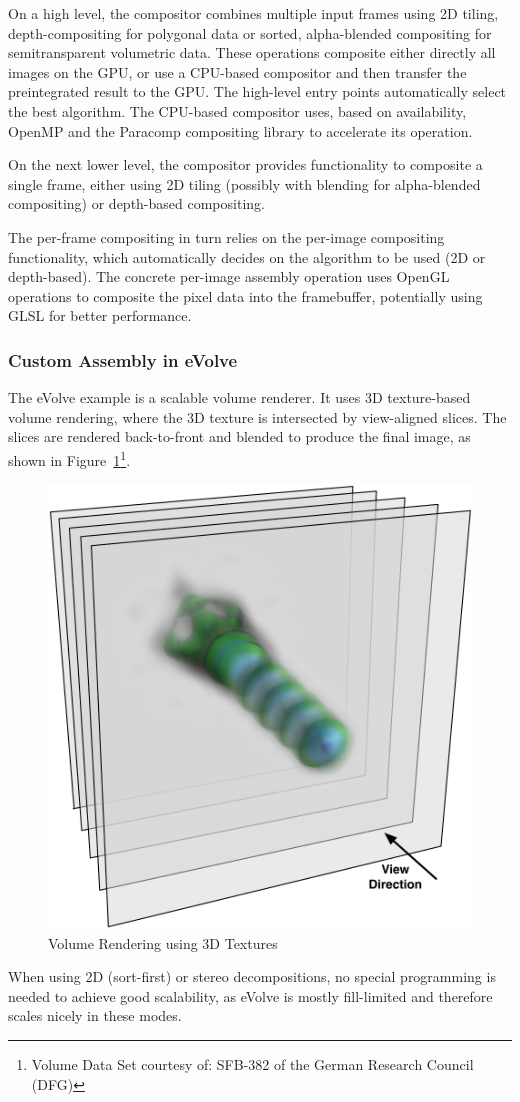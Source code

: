 \documentclass[10pt,a4]{scrartcl}
\newcommand{\fig}[1]{Figure~\ref{#1}}
\begin{document}
On a high level, the compositor combines multiple input frames using 2D
tiling, depth-compositing for polygonal data or sorted, alpha-blended
compositing for semitransparent volumetric data. These operations
composite either directly all images on the GPU, or use a CPU-based
compositor and then transfer the preintegrated result to the GPU. The
high-level entry points automatically select the best algorithm. The
CPU-based compositor uses, based on availability, OpenMP and the
Paracomp compositing library to accelerate its operation.

On the next lower level, the compositor provides functionality to
composite a single frame, either using 2D tiling (possibly with blending
for alpha-blended compositing) or depth-based compositing. 

The per-frame compositing in turn relies on the per-image compositing
functionality, which automatically decides on the algorithm to be used
(2D or depth-based). The concrete per-image assembly operation uses
OpenGL operations to composite the pixel data into the framebuffer,
potentially using GLSL for better performance.


\subsubsection{Custom Assembly in eVolve}

The \textsf{eVolve} example is a scalable volume renderer. It uses 3D
texture-based volume rendering, where the 3D texture is intersected by
view-aligned slices. The slices are rendered back-to-front and blended
to produce the final image, as shown in \fig{fSlices}\footnote{Volume
  Data Set courtesy of: SFB-382 of the German Research Council (DFG)}.

\begin{figure}
  \includegraphics[width=.382\textwidth]{images/slices.pdf}
  {\caption{\label{fSlices}Volume Rendering using 3D Textures}}\vspace{-2ex}
\end{figure}
When using 2D (sort-first) or stereo decompositions, no special
programming is needed to achieve good scalability, as \textsf{eVolve} is
mostly fill-limited and therefore scales nicely in these modes. 
\end{document}
